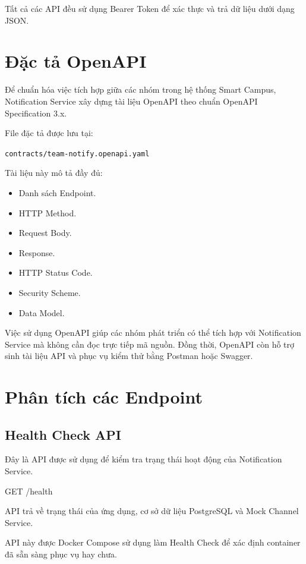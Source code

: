 Tất cả các API đều sử dụng Bearer Token để xác thực và trả dữ liệu dưới dạng JSON.

\section{Đặc tả OpenAPI}

Để chuẩn hóa việc tích hợp giữa các nhóm trong hệ thống Smart Campus, Notification Service xây dựng tài liệu OpenAPI theo chuẩn OpenAPI Specification 3.x.

File đặc tả được lưu tại:

\begin{center}
\texttt{contracts/team-notify.openapi.yaml}
\end{center}

Tài liệu này mô tả đầy đủ:

\begin{itemize}
\item Danh sách Endpoint.
\item HTTP Method.
\item Request Body.
\item Response.
\item HTTP Status Code.
\item Security Scheme.
\item Data Model.
\end{itemize}

Việc sử dụng OpenAPI giúp các nhóm phát triển có thể tích hợp với Notification Service mà không cần đọc trực tiếp mã nguồn. Đồng thời, OpenAPI còn hỗ trợ sinh tài liệu API và phục vụ kiểm thử bằng Postman hoặc Swagger.

\section{Phân tích các Endpoint}

\subsection{Health Check API}

Đây là API được sử dụng để kiểm tra trạng thái hoạt động của Notification Service.

\begin{center}
GET /health
\end{center}

API trả về trạng thái của ứng dụng, cơ sở dữ liệu PostgreSQL và Mock Channel Service.

API này được Docker Compose sử dụng làm Health Check để xác định container đã sẵn sàng phục vụ hay chưa.

